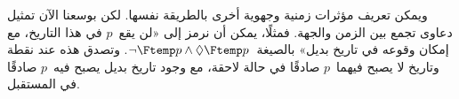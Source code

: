 \documentclass[../../../include/open-logic-section]{subfiles}
\begin{document}
ويمكن تعريف مؤثرات زمنية وجهوية أخرى بالطريقة نفسها. لكن بوسعنا الآن تمثيل
دعاوى تجمع بين الزمن والجهة. فمثلًا، يمكن أن نرمز إلى «لن يقع~$p$ في هذا
التاريخ، مع إمكان وقوعه في تاريخ بديل» بالصيغة~$\lnot \Ftemp p \land \Diamond \Ftemp p$. وتصدق
هذه عند نقطة وتاريخ لا يصبح فيهما~$p$ صادقًا في حالة لاحقة، مع وجود تاريخ
بديل يصبح فيه~$p$ صادقًا في المستقبل.
\end{document}
